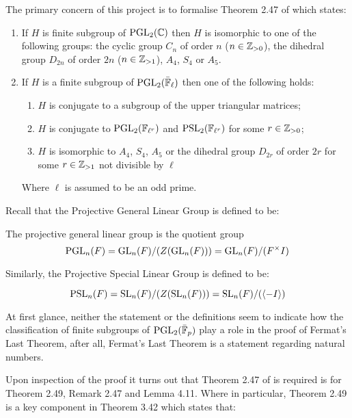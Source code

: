 The primary concern of this project is to formalise Theorem 2.47 of \cite{dtt} which states:

\begin{enumerate}
    \item If $H$ is finite subgroup of $\operatorname{PGL}_2(\mathbb{C})$ then $H$ is isomorphic to one of the following groups: the cyclic group $C_n$ of order $n$ ($n \in \mathbb{Z}_{>0}$), the dihedral group $D_{2n}$ of order $2n$ ($n \in \mathbb{Z}_{>1}$), $A_4$, $S_4$ or $A_5$.
\item If $H$ is a finite subgroup of $\operatorname{PGL}_2(\bar{\mathbb{F}}_\ell)$ then one of the following holds:
\begin{enumerate}
    \item $H$ is conjugate to a subgroup of the upper triangular matrices;
    \item $H$ is conjugate to $\operatorname{PGL}_2(\mathbb{F}_{\ell^r})$ and $\operatorname{PSL}_2(\mathbb{F}_{\ell^{r}})$ for some $r \in \mathbb{Z}_{>0}$;
    \item $H$ is isomorphic to $A_4$, $S_4$, $A_5$ or the dihedral group $D_{2r}$ of order $2r$ for some $r \in \mathbb{Z}_{>1}$ not divisible by $\ell$

\end{enumerate}
    Where $\ell$ is assumed to be an odd prime.
\end{enumerate}

Recall that the Projective General Linear Group is defined to be:

\begin{definition}
    The projective general linear group is the quotient group
    \[    
    \operatorname{PGL}_n(F) = \operatorname{GL}_n(F) / (Z(\operatorname{GL}_n(F))) = \operatorname{GL}_n(F) / (F^\times I) 
    \]
\end{definition}

Similarly, the Projective Special Linear Group is defined to be:

\begin{lemma}
    \[
    \operatorname{PSL}_n(F) = \operatorname{SL}_n(F) / (Z(\operatorname{SL}_n(F))) = \operatorname{SL}_n(F) / (\langle -I\rangle)
    \]
\end{lemma}

At first glance, neither the statement or the definitions seem to indicate how the classification of finite subgroups of $\operatorname{PGL}_2(\bar{\mathbb{F}}_p)$ play a role in the proof of Fermat's Last Theorem, after all, Fermat's Last Theorem is a statement
regarding natural numbers. 

Upon inspection of the proof it turns out that Theorem 2.47 of \cite{dtt} is required is for Theorem 2.49, Remark 2.47 and Lemma 4.11. Where in particular, Theorem 2.49 is a key component in Theorem 3.42 which states that:

